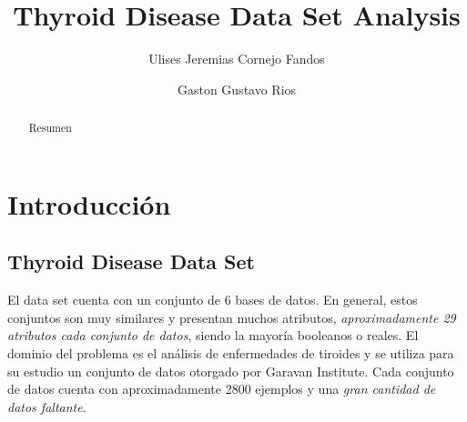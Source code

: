 \documentclass[osajnl,twocolumn,showpacs,superscriptaddress,10pt,floatfix]{revtex4-1} %
\begin{document}
\title{Thyroid Disease Data Set Analysis}

\author{Ulises Jeremias Cornejo Fandos}

\author{Gaston Gustavo Rios}


\begin{abstract}
Resumen
\end{abstract}


\ocis{}%

\maketitle %

\section{Introducción}

\subsection{Thyroid Disease Data Set }

El data set cuenta con un conjunto de 6 bases de datos. En general, estos conjuntos son muy similares y presentan muchos atributos, \textit{aproximadamente 29 atributos cada conjunto de datos}, siendo la mayoría booleanos o reales. El dominio del problema es el análisis de enfermedades de tiroides y se utiliza para su estudio un conjunto de datos otorgado por Garavan Institute. Cada conjunto de datos cuenta con aproximadamente 2800 ejemplos y una \textit{gran cantidad de datos faltante}. \\
\end{document}
